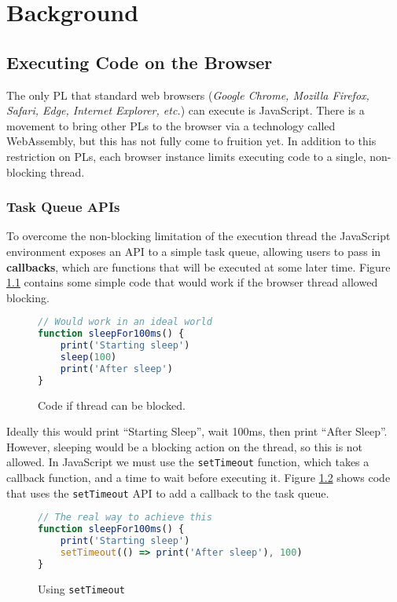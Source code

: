 \chapter{Background}

\section{Executing Code on the Browser}

The only PL that standard web browsers (\emph{Google Chrome, Mozilla Firefox, Safari, Edge, Internet Explorer, etc.}) can execute is JavaScript. There is a movement to bring other PLs to the browser via a technology called WebAssembly, but this has not fully come to fruition yet.  
In addition to this restriction on PLs, each browser instance limits executing code to a single, non-blocking thread.

\subsection{Task Queue APIs}
To overcome the non-blocking limitation of the execution thread the JavaScript environment exposes an API to a simple task queue, allowing users to pass in \textbf{callbacks}, which are functions that will be executed at some later time. Figure \ref{blockingcode} contains some simple code that would work if the browser thread allowed blocking.

\begin{figure}
    \caption{Code if thread can be blocked.}
    \label{blockingcode}
    \begin{lstlisting}[language=javascript]
// Would work in an ideal world
function sleepFor100ms() {
    print('Starting sleep')
    sleep(100)
    print('After sleep')
}
    \end{lstlisting}
\end{figure}

Ideally this would print ``Starting Sleep'', wait 100ms, then print ``After Sleep''. However, sleeping would be a blocking action on the thread, so this is not allowed. In JavaScript we must use the \texttt{setTimeout} function, which takes a callback function, and a time to wait before executing it. Figure \ref{setTimeoutCode} shows code that uses the \texttt{setTimeout} API to add a callback to the task queue.

\begin{figure}
    \caption{Using \texttt{setTimeout}}
    \label{setTimeoutCode}
    \begin{lstlisting}[language=javascript]
// The real way to achieve this
function sleepFor100ms() {
    print('Starting sleep')
    setTimeout(() => print('After sleep'), 100)
}
    \end{lstlisting}
\end{figure}

